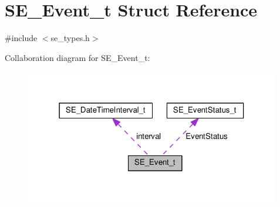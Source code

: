\hypertarget{structSE__Event__t}{}\section{S\+E\+\_\+\+Event\+\_\+t Struct Reference}
\label{structSE__Event__t}


{\ttfamily \#include $<$se\+\_\+types.\+h$>$}



Collaboration diagram for S\+E\+\_\+\+Event\+\_\+t\+:\nopagebreak
\begin{figure}[H]
\begin{center}
\leavevmode
\includegraphics[width=316pt]{structSE__Event__t__coll__graph}
\end{center}
\end{figure}
